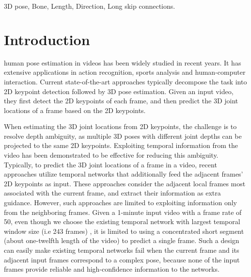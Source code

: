 \documentclass[journal]{IEEEtran}
\begin{document}
\begin{IEEEkeywords}
3D pose, Bone, Length, Direction, Long skip connections.
\end{IEEEkeywords}

\IEEEpeerreviewmaketitle

\section{Introduction}












 human pose estimation in videos has been widely studied in recent years. It has extensive applications in action recognition, sports analysis and human-computer interaction. Current state-of-the-art approaches \cite{pavllo20193d,lin2019trajectory,chen2019weakly} typically decompose the task into 2D keypoint detection followed by 3D pose estimation. Given an input video, they first detect the 2D keypoints of each frame, and then predict the 3D joint locations of a frame based on the 2D keypoints.

When estimating the 3D joint locations from 2D keypoints, the challenge is to resolve depth ambiguity, as multiple 3D poses with different joint depths can be projected to the same 2D keypoints. Exploiting temporal information from the video has been demonstrated to be effective for reducing this ambiguity. Typically, to predict the 3D joint locations of a frame in a video, recent approaches \cite{pavllo20193d,rayat2018exploiting,lee2018propagating} utilize temporal networks that additionally feed the adjacent frames' 2D keypoints as input. These approaches consider the adjacent local frames most associated with the current frame, and extract their information as extra guidance. However, such approaches are limited to exploiting information only from the neighboring frames. Given a 1-minute input video with a frame rate of 50, even though we choose the existing temporal network with largest temporal window size (i.e 243 frames) \cite{pavllo20193d}, it is limited to using a concentrated short segment (about one-twelfth length of the video) to predict a single frame. Such a design can easily make existing temporal networks fail when the current frame and its adjacent input frames correspond to a complex pose, because none of the input frames provide reliable and high-confidence information to the networks. 
\end{document}
